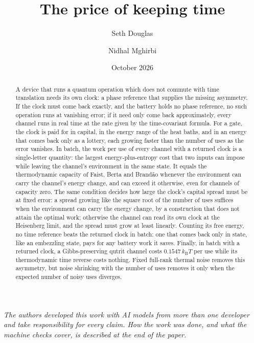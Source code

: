 \documentclass[11pt]{article}
\title{The price of keeping time}
\author{Seth Douglas \and Nidhal Mghirbi}
\date{October 2026}
\theoremstyle{definition}
\theoremstyle{remark}
\newcommand{\kB}{k_{\mathrm B}}
\begin{document}
\maketitle

\begin{abstract}
A device that runs a quantum operation which does not commute with time translation needs its own clock: a phase reference that supplies the missing asymmetry. If the clock must come back exactly, and the battery holds no phase reference, no such operation runs at vanishing error; if it need only come back approximately, every channel runs in real time at the rate given by the time-covariant formula. For a gate, the clock is paid for in capital, in the energy range of the heat baths, and in an energy that comes back only as a lottery, each growing faster than the number of uses as the error vanishes. In batch, the work per use of every channel with a returned clock is a single-letter quantity: the largest energy-plus-entropy cost that two inputs can impose while leaving the channel's environment in the same state. It equals the thermodynamic capacity of Faist, Berta and Brand\~ao whenever the environment can carry the channel's energy change, and can exceed it otherwise, even for channels of capacity zero. The same condition decides how large the clock's capital spread must be at fixed error: a spread growing like the square root of the number of uses suffices when the environment can carry the energy change, by a construction that does not attain the optimal work; otherwise the channel can read its own clock at the Heisenberg limit, and the spread must grow at least linearly. Counting its free energy, no time reference beats the returned clock in batch: one that comes back only in state, like an embezzling state, pays for any battery work it saves. Finally, in batch with a returned clock, a Gibbs-preserving qutrit channel costs $0.1547\,\kB T$ per use while its thermodynamic time reverse costs nothing. Fixed full-rank thermal noise removes this asymmetry, but noise shrinking with the number of uses removes it only when the expected number of noisy uses diverges.
\end{abstract}

\noindent\emph{The authors developed this work with AI models from more than one developer and take responsibility for every claim. How the work was done, and what the machine checks cover, is described at the end of the paper.}

{\small\tableofcontents}

\end{document}
